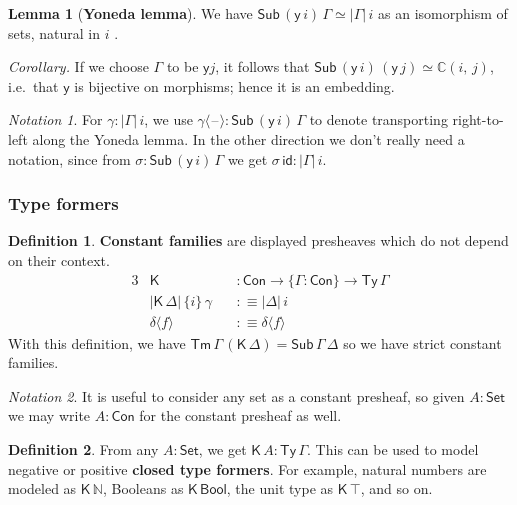 \documentclass[12pt,a4paper,twoside,openany]{book}
\theoremstyle{remark}
\newtheorem{notation}{Notation}
\theoremstyle{definition}
\newtheorem{mydefinition}{Definition}
\newtheorem{mylemma}{Lemma}
\theoremstyle{theorem}
\newcommand{\ms}[1]{\mathsf{#1}}
\newcommand{\mbb}[1]{\mathbb{#1}}
\newcommand{\id}{\mathsf{id}}
\newcommand{\Con}{\mathsf{Con}}
\newcommand{\Sub}{\mathsf{Sub}}
\newcommand{\Tm}{\mathsf{Tm}}
\newcommand{\Ty}{\mathsf{Ty}}
\newcommand{\blank}{\mathord{\hspace{1pt}\text{--}\hspace{1pt}}}
\newcommand{\Set}{\mathsf{Set}}
\newcommand{\K}{\mathsf{K}}
\newcommand{\Bool}{\ms{Bool}}
\newcommand{\mbbC}{\mbb{C}}
\newcommand{\lab}{\langle}
\newcommand{\rab}{\rangle}
\newcommand{\defn}{:\equiv}
\newcommand{\yon}{\ms{y}}
\begin{document}
\begin{mylemma}[\textbf{Yoneda lemma}] We have $\Sub\,(\yon\,i)\,\Gamma \simeq |\Gamma|\,i$ as an isomorphism of sets, natural in $i$ \cite{TODO}.
\end{mylemma}

\noindent\emph{Corollary.} If we choose $\Gamma$ to be $\yon j$, it follows that
$\Sub\,(\yon\,i)\,(\yon\,j) \simeq \mbbC(i,\,j)$, i.e.\ that $\yon$ is
bijective on morphisms; hence it is an embedding.

\begin{notation}
\label{not:yoneda}
For $\gamma : |\Gamma|\,i$, we use $\gamma\lab \blank \rab :
\Sub\,(\yon\,i)\,\Gamma $ to denote transporting right-to-left along the Yoneda
lemma. In the other direction we don't really need a notation, since from
$\sigma : \Sub\,(\yon\,i)\,\Gamma$ we get $\sigma\,\id : |\Gamma|\,i$.
\end{notation}

\subsubsection{Type formers}

\begin{mydefinition}
\label{def:k-psh}
\textbf{Constant families} are displayed presheaves which do not depend on their context.
\begin{alignat*}{3}
  & \K &&: \Con \to \{\Gamma : \Con \} \to \Ty\,\Gamma\\
  & |\K\,\Delta|\,\{i\}\,\gamma\,&&\defn |\Delta|\,i \\
  & \delta\lab f \rab &&\defn \delta \lab f \rab
\end{alignat*}
With this definition, we have $\Tm\,\Gamma\,(\K\,\Delta) = \Sub\,\Gamma\,\Delta$
so we have strict constant families.
\end{mydefinition}

\begin{notation}
It is useful to consider any set as a constant presheaf, so
given $A : \Set$ we may write $A : \Con$ for the constant presheaf
as well.
\end{notation}

\begin{mydefinition}
From any $A : \Set$, we get $\K\,A : \Ty\,\Gamma$. This can be used to
model negative or positive \textbf{closed type formers}. For example, natural
numbers are modeled as $\K\,\mbb{N}$, Booleans as $\K\,\Bool$, the unit type as
$\K\,\top$, and so on.
\end{mydefinition}
\end{document}
